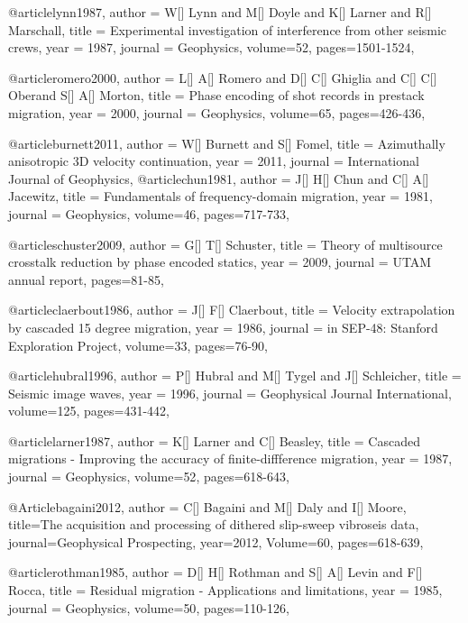 {@article{lynn1987,
  author =	 {W[] Lynn and M[] Doyle and K[] Larner and R[] Marschall},
  title =	 {Experimental investigation of interference from other seismic crews},
  year =	 1987,
  journal =	 {Geophysics},
  volume={52},
 pages=1501-1524,
}

@article{romero2000,
  author =	 {L[] A[] Romero and D[] C[] Ghiglia and C[] C[] Oberand S[] A[] Morton},
  title =	 {Phase encoding of shot records in prestack migration},
  year =	 2000,
  journal =	 {Geophysics},
  volume={65},
 pages=426-436,
}

@article{burnett2011,
  author =	 {W[] Burnett and S[] Fomel},
  title =	 {Azimuthally anisotropic 3{D} velocity continuation},
  year =	 2011,
  journal =	 {International Journal of Geophysics},
}
@article{chun1981,
  author =	 {J[] H[] Chun and C[] A[] Jacewitz},
  title =	 {Fundamentals of frequency-domain migration},
  year =	 1981,
  journal =	 {Geophysics},
  volume={46},
 pages=717-733,
}

@article{schuster2009,
  author =	 {G[] T[] Schuster},
  title =	 {Theory of multisource crosstalk reduction by phase encoded statics},
  year =	 2009,
  journal =	 {UTAM annual report},
 pages=81-85,
}

@article{claerbout1986,
  author =	 {J[] F[] Claerbout},
  title =	 {Velocity extrapolation by cascaded 15 degree migration},
  year =	 1986,
  journal =	 {in SEP-48: Stanford Exploration Project},
  volume={33},
 pages=76-90,
}

@article{hubral1996,
  author =	 {P[] Hubral and M[] Tygel and J[] Schleicher},
  title =	 {Seismic image waves},
  year =	 1996,
  journal =	 {Geophysical Journal International},
  volume={125},
 pages=431-442,
}

@article{larner1987,
  author =	 {K[] Larner and C[] Beasley},
  title =	 {Cascaded migrations - Improving the accuracy of finite-diffference migration},
  year =	 1987,
  journal =	 {Geophysics},
  volume={52},
 pages=618-643,
}

@Article{bagaini2012,
  author = {C[] Bagaini and M[] Daly and I[] Moore},
  title={The acquisition and processing of dithered slip-sweep vibroseis data},
  journal={Geophysical Prospecting},
  year=2012,
  Volume=60,
  pages={618-639},
}

@article{rothman1985,
  author =	 {D[] H[] Rothman and S[] A[] Levin and F[] Rocca},
  title =	 {Residual  migration - Applications and limitations},
  year =	 1985,
  journal =	 {Geophysics},
  volume={50},
 pages=110-126,
}

}
